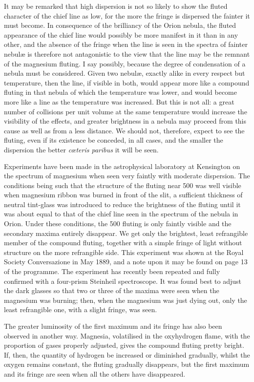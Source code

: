 \documentclass[a4paper, 12pt, oneside, polutonikogreek, english]{article}
\begin{document}
It may be remarked that high dispersion is not so likely to show the fluted character of the chief line as low, for the more the fringe is dispersed the fainter it must become. In consequence of the brilliancy of the Orion nebula, the fluted appearance of the chief line would possibly be more manifest in it than in any other, and the absence of the fringe when the line is seen in the spectra of fainter nebulæ is therefore not antagonistic to the view that the line may be the remnant of the magnesium fluting. I say possibly, because the degree of condensation of a nebula must be considered. Given two nebulæ, exactly alike in every respect but temperature, then the line, if visible in both, would appear more like a compound fluting in that nebula of which the temperature was lower, and would become more like a line as the temperature was increased. But this is not all: a great number of collisions per unit volume at the same temperature would increase the visibility of the effects, and greater brightness in a nebula may proceed from this cause as well as from a less distance. We should not, therefore, expect to see the fluting, even if its existence be conceded, in all cases, and the smaller the dispersion the better \emph{cœteris paribus} it will be seen.

Experiments have been made in the astrophysical laboratory at Kensington on the spectrum of magnesium when seen very faintly with moderate dispersion. The conditions being such that the structure of the fluting near 500 was well visible when magnesium ribbon was burned in front of the slit, a sufficient thickness of neutral tint-glass was introduced to reduce the brightness of the fluting until it was about equal to that of the chief line seen in the spectrum of the nebula in Orion. Under these conditions, the 500 fluting is only faintly visible and the secondary maxima entirely disappear. We get only the brightest, least refrangible member of the compound fluting, together with a simple fringe of light without structure on the more refrangible side. This experiment was shown at the Royal Society Conversazione in May 1889, and a note upon it may be found on page 13 of the programme. The experiment has recently been repeated and fully confirmed with a four-prism Steinheil spectroscope. It was found best to adjust the dark glasses so that two or three of the maxima were seen when the magnesium was burning; then, when the magnesium was just dying out, only the least refrangible one, with a slight fringe, was seen.

The greater luminosity of the first maximum and its fringe has also been observed in another way. Magnesia, volatilised in the oxyhydrogen flame, with the proportion of gases properly adjusted, gives the compound fluting pretty bright. If, then, the quantity of hydrogen be increased or diminished gradually, whilst the oxygen remains constant, the fluting gradually disappears, but the first maximum and its fringe are seen when all the others have disappeared.
\end{document}
